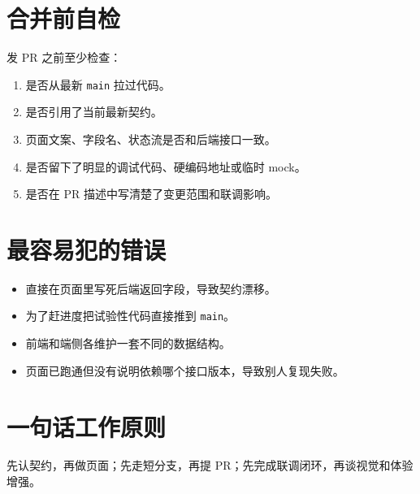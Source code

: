 \documentclass[11pt,a4paper]{ctexart}
\begin{document}
\section{合并前自检}

发 PR 之前至少检查：

\begin{enumerate}
  \item 是否从最新 \texttt{main} 拉过代码。
  \item 是否引用了当前最新契约。
  \item 页面文案、字段名、状态流是否和后端接口一致。
  \item 是否留下了明显的调试代码、硬编码地址或临时 mock。
  \item 是否在 PR 描述中写清楚了变更范围和联调影响。
\end{enumerate}

\section{最容易犯的错误}

\begin{itemize}
  \item 直接在页面里写死后端返回字段，导致契约漂移。
  \item 为了赶进度把试验性代码直接推到 \texttt{main}。
  \item 前端和端侧各维护一套不同的数据结构。
  \item 页面已跑通但没有说明依赖哪个接口版本，导致别人复现失败。
\end{itemize}

\section{一句话工作原则}

先认契约，再做页面；先走短分支，再提 PR；先完成联调闭环，再谈视觉和体验增强。
\end{document}
